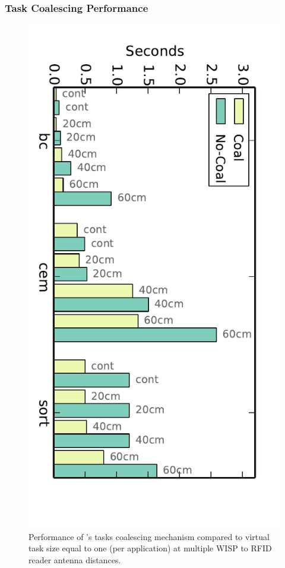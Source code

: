 \subsubsection{Task Coalescing Performance}
\label{sec:results_coalescing}

\begin{figure}
	\centering
	\includegraphics[width=\columnwidth]{figures/coalescing}
	\caption{Performance of \sys's  tasks coalescing mechanism compared to virtual task size equal to one (per application) at multiple WISP to RFID reader antenna distances.}
	\label{fig:coalescing}
\end{figure}

